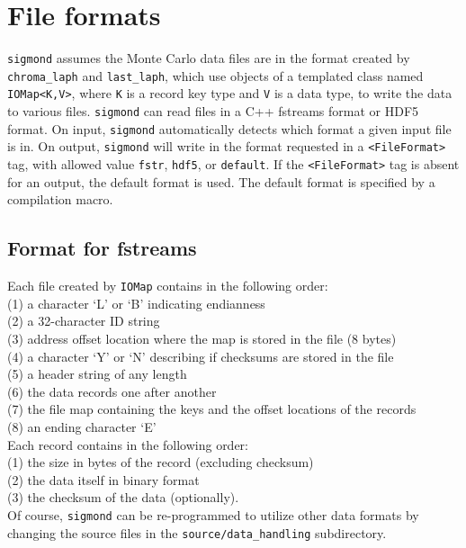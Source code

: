 \documentclass[12pt]{article}
\newcommand{\vb}{\texttt}
\begin{document}
\section{File formats}

\vb{sigmond} assumes the Monte Carlo data files are in the format
created by \vb{chroma\_laph} and \vb{last\_laph}, which use objects
of a templated class named \vb{IOMap<K,V>}, where \vb{K} is a record
key type and \vb{V} is a data type, to write the data to various
files.  \vb{sigmond} can read files in a C++ fstreams format or HDF5 format.
On input, \vb{sigmond} automatically detects which format a given input
file is in.  On output, \vb{sigmond} will write in the format requested
in a \vb{<FileFormat>} tag, with allowed value \vb{fstr}, \vb{hdf5},
or \vb{default}.  If the \vb{<FileFormat>} tag is absent for an output,
the default format is used.  The default format is specified by a 
compilation macro.

\subsection{Format for fstreams}
Each file created by \vb{IOMap} contains in the following order:\\
\hspace*{20pt}(1) a character `L' or `B' indicating endianness\\
\hspace*{20pt}(2) a 32-character ID string\\
\hspace*{20pt}(3) address offset location where the map is stored in the file (8 bytes) \\
\hspace*{20pt}(4) a character `Y' or `N' describing if checksums are stored in the file \\
\hspace*{20pt}(5) a header string of any length\\
\hspace*{20pt}(6) the data records one after another \\
\hspace*{20pt}(7) the file map containing the keys and the offset locations of the records\\
\hspace*{20pt}(8) an ending character `E'\\
Each record contains in the following order:\\
\hspace*{20pt}(1) the size in bytes of the record (excluding checksum)\\
\hspace*{20pt}(2) the data itself in binary format\\
\hspace*{20pt}(3) the checksum of the data (optionally).\\
Of course, \vb{sigmond} can be re-programmed to utilize other data formats
by changing the source files in the \vb{source/data\_handling} subdirectory.
\end{document}
